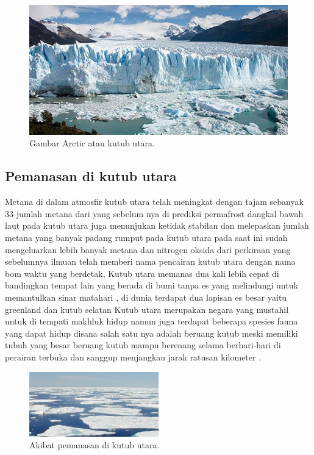 \begin{figure}[ht]
\centerline{\includegraphics[width=.5\textwidth]{figures/arctic.jpg}}
\caption{Gambar Arctic atau kutub utara.}	
\label{Kutub_Utara}
\end{figure}
	
\subsection{Pemanasan di kutub utara}
		Metana di dalam atmosfir kutub utara telah meningkat dengan tajam sebanyak 33%
	jumlah metana dari yang sebelum nya di prediksi permafrost dangkal bawah laut pada kutub utara juga menunjukan ketidak stabilan dan melepaskan jumlah metana
	yang banyak padang rumput pada kutub utara pada saat ini sudah mengeluarkan lebih banyak metana dan nitrogen oksida dari perkiraan yang sebelumnya ilmuan 
	telah memberi nama pencairan kutub utara dengan nama bom waktu yang berdetak, Kutub utara memanas dua kali lebih cepat di bandingkan tempat lain yang berada
	di bumi tanpa es yang melindungi untuk memantulkan sinar matahari , di dunia terdapat dua lapisan es besar yaitu greenland dan kutub selatan Kutub utara merupakan
	negara yang mustahil untuk di tempati makhluk hidup namun juga terdapat beberapa spesies fauna yang dapat hidup disana salah satu nya adalah beruang kutub
	meski memiliki tubuh yang besar beruang kutub mampu berenang selama berhari-hari di perairan terbuka dan sanggup menjangkau jarak ratusan kilometer .

\begin{figure}[ht]
\centerline{\includegraphics[width=0.5\textwidth]{figures/arctic1.pdf}}
\caption{Akibat pemanasan di kutub utara.}	
\label{Pemanasan_Kutub_Utara}
\end{figure}


